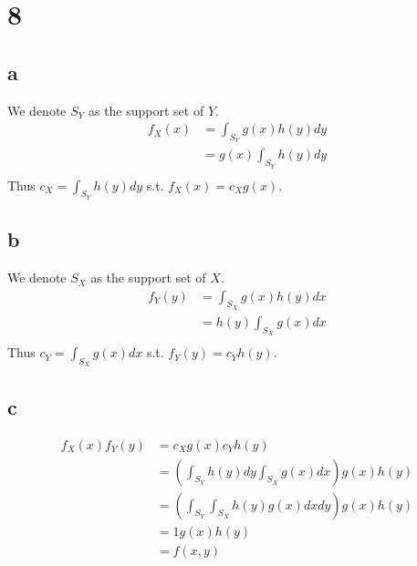 \documentclass[10pt]{article}
\begin{document}
\section*{8}
\subsection*{a}
We denote $S_Y$ as the support set of $Y.$
\begin{align*}
    f_X(x) &= \int_{S_Y}g(x)h(y)dy\\
    &=g(x)\int_{S_Y}h(y)dy\\
\end{align*}
Thus $c_X=\int_{S_Y}h(y)dy$ s.t. $f_X(x)=c_Xg(x)$.
\subsection*{b}
We denote $S_X$ as the support set of $X.$
\begin{align*}
    f_Y(y) &= \int_{S_X}g(x)h(y)dx\\
    &=h(y)\int_{S_X}g(x)dx\\
\end{align*}
Thus $c_Y=\int_{S_X}g(x)dx$ s.t. $f_Y(y)=c_Yh(y)$.
\subsection*{c}
\begin{align*}
    f_X(x)f_Y(y)&= c_Xg(x)c_Yh(y)\\
    &= \left (\int_{S_Y}h(y)dy\int_{S_X}g(x)dx\right )g(x)h(y)\\
    &= \left (\int_{S_Y}\int_{S_X}h(y)g(x)dxdy\right )g(x)h(y)\\
    &= 1g(x)h(y)\\
    &= f(x,y)
\end{align*}
\end{document}
